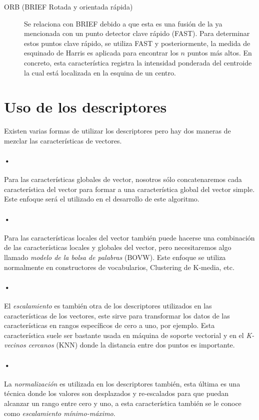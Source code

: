 \begin{description}
\item[ORB (BRIEF Rotada y orientada rápida)]{Se relaciona con BRIEF debido a
que esta es una fusión de la ya mencionada con un punto detector clave rápido (FAST). Para determinar estos puntos clave rápido, se utiliza FAST y posteriormente, la medida de esquinado de Harris es aplicada para encontrar los $n$ puntos más altos. En concreto, esta característica registra la intensidad ponderada del centroide la cual está localizada en la esquina de un centro.}
\end{description}

\section{Uso de los descriptores}
Existen varias formas de utilizar los descriptores pero hay dos maneras de mezclar las características de vectores.

\paragraph{•} Para las características globales de vector, nosotros sólo concatenaremos cada característica del vector para formar a una característica global del vector simple. Este enfoque será el utilizado en el desarrollo de este algoritmo.

\paragraph{•} Para las características locales del vector también puede hacerse una combinación de las características locales y globales del vector, pero necesitaremos algo llamado \emph{modelo de la bolsa de palabras} (BOVW). Este enfoque se utiliza normalmente en constructores de vocabularios, Clustering de K-media, etc.

\paragraph{•} El \emph{escalamiento} es también otra de los descriptores utilizados en las características de los vectores, este sirve para transformar los datos de las características en rangos específicos de cero a uno, por ejemplo. Esta característica suele ser bastante usada en máquina de soporte vectorial y en el \emph{K-vecinos cercanos} (KNN) donde la distancia entre dos puntos es importante.

\paragraph{•} La \emph{normalización} es utilizada en los descriptores también, esta última es una técnica donde los valores son desplazados y re-escalados  para que puedan alcanzar un rango entre cero y uno, a esta característica también se le conoce como \emph{escalamiento mínimo-máximo}.

